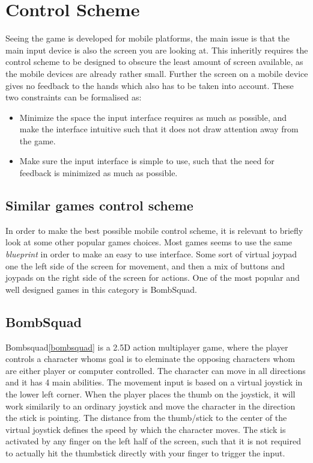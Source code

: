 \section{Control Scheme}
Seeing the game is developed for mobile platforms, the main issue is that the main input device is also the screen you are looking at. 
This inheritly requires the control scheme to be designed to obscure the least amount of screen available, as the mobile devices are already rather small. 
Further the screen on a mobile device gives no feedback to the hands which also has to be taken into account.
These two constraints can be formalised as:
\begin{itemize}
\item Minimize the space the input interface requires as much as possible, and make the interface intuitive such that it does not draw attention away from the game.
\item Make sure the input interface is simple to use, such that the need for feedback is minimized as much as possible.
\end{itemize}

\subsection{Similar games control scheme}
In order to make the best possible mobile control scheme, it is relevant to briefly look at some other popular games choices.
Most games seems to use the same \emph{blueprint} in order to make an easy to use interface. Some sort of virtual joypad one the left side of the screen for movement, and then a mix of buttons and joypads on the right side of the screen for actions. 
One of the most popular and well designed games in this category is BombSquad.

\subsection*{BombSquad}
Bombsquad\ref{bombsquad} is a 2.5D action multiplayer game, where the player controls a character whoms goal is to eleminate the opposing characters whom are either player or computer controlled.
The character can move in all directions and it has 4 main abilities. 
The movement input is based on a virtual joystick in the lower left corner.
When the player places the thumb on the joystick, it will work similarily to an ordinary joystick and move the character in the direction the stick is pointing. 
The distance from the thumb/stick to the center of the virtual joystick defines the speed by which the character moves. 
The stick is activated by any finger on the left half of the screen, such that it is not required to actually hit the thumbstick directly with your finger to trigger the input.

